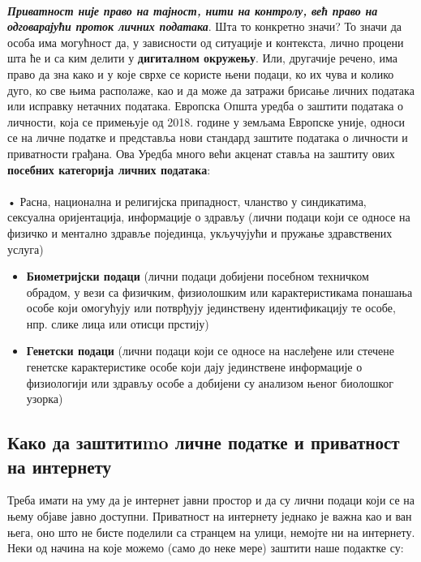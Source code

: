 \documentclass[a4paper]{article}
\begin{document}
\paragraph{} \textbf{\textit{Приватност није право на тајност, нити на контролу, већ право на одговарајући проток личних података}}\cite{1}. Шта то конкретно значи? То значи да особа има могућност да, у зависности од ситуације и контекста, лично процени шта ће и са ким делити у \textbf{дигиталном окружењу}. Или, другачије речено, има право да зна како и у које сврхе се користе њени подаци, ко их чува и колико дуго, ко све њима располаже, као и да може да затражи брисање личних података или исправку нетачних података.
Европска Oпшта уредба о заштити података о личности, која се  примењује од 2018. године у земљама Европске уније, односи се на личне податке и представља нови стандард заштите података о личности и приватности грађана. Ова Уредба много већи акценат ставља на заштиту ових \textbf{посебних категорија личних података}:
\paragraph{} 
    • Расна, национална и религијска припадност, чланство у синдикатима, сексуална оријентација, информације о здрављу (лични подаци који се односе на физичко и ментално здравље појединца, укључујући и пружање здравствених услуга)
   
\begin{itemize}
 
\item     \textbf{Биометријски подаци} (лични подаци добијени посебном техничком обрадом, у вези са физичким, физиолошким или карактеристикама понашања особе који омогућују или потврђују јединствену идентификацију те особе, нпр. слике лица или отисци прстију)
    
\item     \textbf{Генетски подаци} (лични подаци који се односе на наслеђене или стечене генетске карактеристике особе који дају јединствене информације о физиологији или здрављу особе а добијени су анализом њеног биолошког узорка)
    
\end{itemize}    
    
\subsection{Како да заштитиmo личне податке и приватност на интернету}

Треба имати на уму да је интернет јавни простор и да су лични подаци који се на њему објаве јавно доступни. Приватност на интернету једнако је важна као и ван њега, оно што не бисте поделили са странцем на улици, немојте ни на интернету. 
	Неки од начина на које можемо (само до неке мере) заштити наше подактке су:
	
\end{document}
